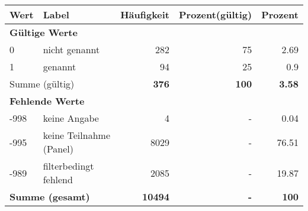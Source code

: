      \begin{longtable}{lXrrr}
     \toprule
     \textbf{Wert} & \textbf{Label} & \textbf{Häufigkeit} & \textbf{Prozent(gültig)} & \textbf{Prozent} \\
     \endhead
     \midrule
     \multicolumn{5}{l}{\textbf{Gültige Werte}}\\

     0 &
     \multicolumn{1}{X}{ nicht genannt   } &


       \num{282} &
       \num[round-mode=places,round-precision=2]{75} &
         \num[round-mode=places,round-precision=2]{2.69} \\

     1 &
     \multicolumn{1}{X}{ genannt   } &


       \num{94} &
       \num[round-mode=places,round-precision=2]{25} &
         \num[round-mode=places,round-precision=2]{0.9} \\
     \midrule
     \multicolumn{2}{l}{Summe (gültig)} &
       \textbf{\num{376}} &
     \textbf{\num{100}} &
       \textbf{\num[round-mode=places,round-precision=2]{3.58}} \\
     \multicolumn{5}{l}{\textbf{Fehlende Werte}}\\
       -998 &
       keine Angabe &
         \num{4} &
        - &
         \num[round-mode=places,round-precision=2]{0.04} \\
       -995 &
       keine Teilnahme (Panel) &
         \num{8029} &
        - &
         \num[round-mode=places,round-precision=2]{76.51} \\
       -989 &
       filterbedingt fehlend &
         \num{2085} &
        - &
         \num[round-mode=places,round-precision=2]{19.87} \\
     \midrule
     \multicolumn{2}{l}{\textbf{Summe (gesamt)}} &
          \textbf{\num{10494}} &
        \textbf{-} &
        \textbf{\num{100}} \\
     \bottomrule
     \end{longtable}
     
